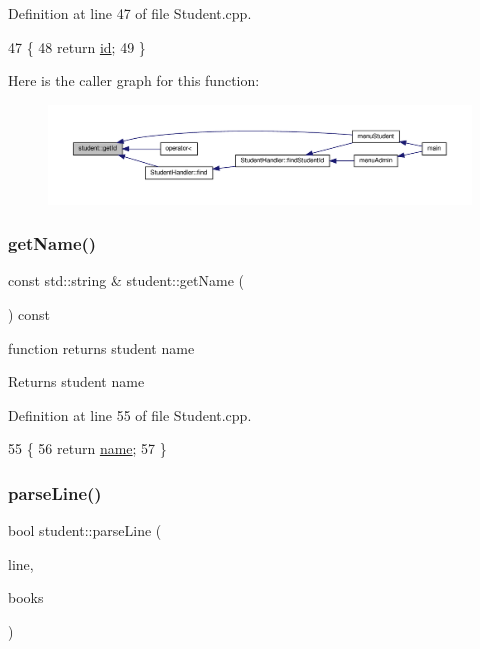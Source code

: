 Definition at line 47 of file Student.\+cpp.


\begin{DoxyCode}
47                          \{
48     \textcolor{keywordflow}{return} \hyperlink{classstudent_a8215d11b0d1adc77e0808a0ff4d0f6a2}{id};
49 \}
\end{DoxyCode}
Here is the caller graph for this function\+:
\nopagebreak
\begin{figure}[H]
\begin{center}
\leavevmode
\includegraphics[width=350pt]{classstudent_a718b1fdd02dd1ed06110f9e0e7ec7720_icgraph}
\end{center}
\end{figure}
\mbox{\label{classstudent_aeeeae15e9a049b1e0973f91bd55fd78b}} 
\subsubsection{\texorpdfstring{get\+Name()}{getName()}}
{\footnotesize\ttfamily const std\+::string \& student\+::get\+Name (\begin{DoxyParamCaption}{ }\end{DoxyParamCaption}) const}

function returns student name \begin{DoxyReturn}{Returns}
student name 
\end{DoxyReturn}


Definition at line 55 of file Student.\+cpp.


\begin{DoxyCode}
55                                         \{
56     \textcolor{keywordflow}{return} \hyperlink{classstudent_a8bba46a454eaecf8619a68c4c38c7b8d}{name};
57 \}
\end{DoxyCode}
\mbox{\label{classstudent_a73c407020ea392b45dc9ff9babc0850b}} 
\subsubsection{\texorpdfstring{parse\+Line()}{parseLine()}}
{\footnotesize\ttfamily bool student\+::parse\+Line (\begin{DoxyParamCaption}\item[{std\+::string \&}]{line,  }\item[{\hyperlink{class_book_handler}{Book\+Handler} \&}]{books }\end{DoxyParamCaption})}

